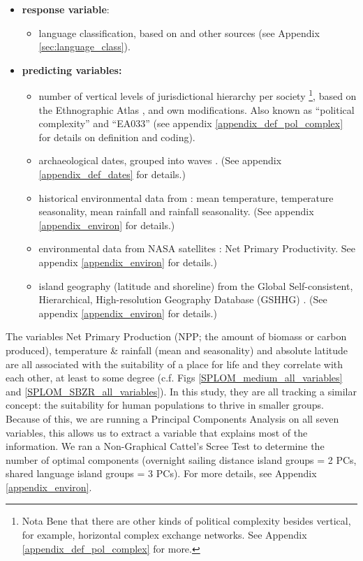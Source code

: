 \documentclass[unnumsec,webpdf,modern,medium]{oup-authoring-template}
\begin{document}
\begin{itemize}
\item \textbf{response variable}:
\begin{itemize}
\item language classification, based on \citet{glottolog40} and other sources (see Appendix \ref{sec:language_class}).
\end{itemize}
\item \textbf{predicting variables:}
\begin{itemize}
\item number of vertical levels of jurisdictional hierarchy per society \footnote{Nota Bene that there are other kinds of political complexity besides vertical, for example, horizontal complex exchange networks. See Appendix \ref{appendix_def_pol_complex} for more.}, based on the Ethnographic Atlas \citep{gray1998ethnographic, d_place_all}, \citet{sheehan2018coevolution} and own modifications. Also known as ``political complexity'' and ``EA033'' (see appendix \ref{appendix_def_pol_complex} for details on definition and coding).
\item archaeological dates, grouped into waves \citep{intoh2007reconnaissance, intoh2008ongoing, rieth_cochrane_2018, levin_seikel_miles_2019, pol_outliers_stat_art, Napolitano_et_al_yap}. (See appendix \ref{appendix_def_dates} for details.)
\item historical environmental data from \citet{ecoclimate}: mean temperature, temperature seasonality, mean rainfall and rainfall seasonality. (See appendix \ref{appendix_environ} for details.)
\item environmental data from NASA satellites \citep{running2021modis_aqua, running2021modis_terra}: Net Primary Productivity. See appendix \ref{appendix_environ} for details.)
\item island geography (latitude and shoreline) from the Global Self-consistent, Hierarchical, High-resolution Geography Database (GSHHG) \citep{wessel1996global}.  (See appendix \ref{appendix_environ} for details.)
\end{itemize}
\end{itemize}

The variables Net Primary Production (NPP; the amount of biomass or carbon produced), temperature \& rainfall (mean and seasonality) and absolute latitude are all associated with the suitability of a place for life and they correlate with each other, at least to some degree (c.f. Figs \ref{SPLOM_medium_all_variables} and \ref{SPLOM_SBZR_all_variables}). In this study, they are all tracking a similar concept: the suitability for human populations to thrive in smaller groups. Because of this, we are running a Principal Components Analysis on all seven variables, this allows us to extract a variable that explains most of the information. We ran a Non-Graphical Cattel's Scree Test \citep{cattell1966scree, R-nFactors} to determine the number of optimal components (overnight sailing distance island groups = 2 PCs, shared language island groups = 3 PCs). For more details, see Appendix \ref{appendix_environ}.
\end{document}
